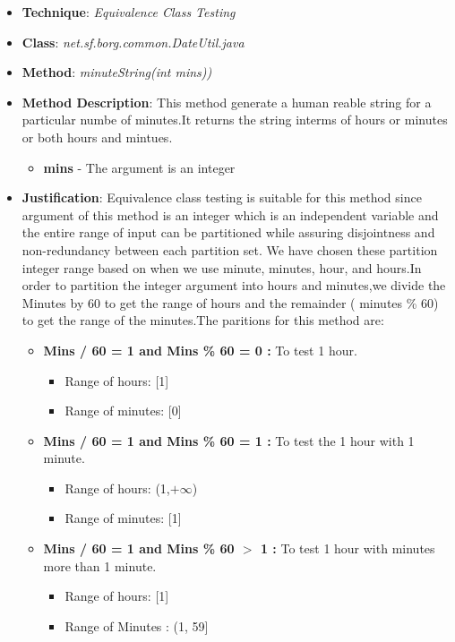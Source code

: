 \documentclass[fontsize=12pt,paper=letter,twoside]{scrartcl}
\begin{document}
\begin{itemize}
\item \textbf{Technique}: \emph{Equivalence Class Testing}
\item \textbf{Class}: \emph{net.sf.borg.common.DateUtil.java}
\item \textbf{Method}: \emph{minuteString(int mins))}
\item \textbf{Method Description}:
This method generate a human reable string for a particular numbe of minutes.It returns the string interms of hours or minutes or both hours and mintues.
\begin{itemize}
\item \textbf{mins} - The argument is an integer
\end{itemize}
\item \textbf{Justification}: Equivalence class testing is suitable for this method since argument of this method is an integer which is an independent variable and the entire range of input can be partitioned while assuring disjointness and non-redundancy between each partition set. We have chosen these partition integer range based on when we use minute, minutes, hour, and hours.In order to partition the integer argument into hours and minutes,we divide the Minutes by 60 to get the range of hours and  the remainder ( minutes \% 60) to get the range of the minutes.The paritions for this method are:
 \begin{itemize}
\item \textbf{ Mins / 60 = 1 and Mins \% 60 = 0 :} To test 1 hour.
 \begin{itemize}
 \item Range of hours: [1]
 \item Range of minutes: [0]
\end{itemize}
\item \textbf{ Mins / 60 = 1 and Mins \% 60 = 1 :} To test the 1 hour with 1 minute.
 \begin{itemize}
 \item Range of hours: (1,$+\infty$)
 \item Range of minutes: [1]
\end{itemize}
\item \textbf{ Mins / 60 = 1 and Mins \% 60  $>$  1 :} To test 1 hour with minutes more than 1 minute. 
 \begin{itemize}
 \item  Range of hours: [1]
\item  Range of Minutes : (1, 59]
\end{itemize}

\end{itemize}
\end{itemize}
\end{document}
